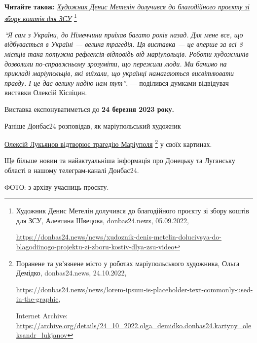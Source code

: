 \textbf{Читайте також:} \href{https://donbas24.news/news/xudoznik-denis-metelin-dolucivsya-do-blagodiinogo-projektu-zi-zboru-kostiv-dlya-zsu-video}{\emph{Художник Денис Метелін долучився до благодійного проєкту зі збору коштів для ЗСУ}}%
\footnote{Художник Денис Метелін долучився до благодійного проєкту зі збору коштів для ЗСУ, Алевтина Швецова, donbas24.news, 05.09.2022, \par%
\url{https://donbas24.news/news/xudoznik-denis-metelin-dolucivsya-do-blagodiinogo-projektu-zi-zboru-kostiv-dlya-zsu-video}%
}


\begin{leftbar}
\emph{\enquote{Я сам з України, до Німеччини приїхав багато років назад. Для мене все, що
відбувається в Україні — велика трагедія. Ця виставка — це вперше за
всі 8 місяців така потужна рефлексія-відповідь від маріупольців. Роботи
художників дозволили по-справжньому зрозуміти, що пережили люди. Ми
бачимо на прикладі маріупольців, які виїхали, що українці намагаються
висвітлювати правду. І це дає велику надію нам тут}}, — поділився
думками відвідувач виставки Олексій Кісліцин.
\end{leftbar}

Виставка експонуватиметься до \textbf{24 березня 2023 року.}


Раніше Донбас24 розповідав, як маріупольський художник\par\noindent\href{https://archive.org/details/24_10_2022.olga_demidko.donbas24.kartyny_oleksandr_lukjanov}{Олексій Лукьянов відтворює трагедію Маріуполя}%
\footnote{Поранене та ув'язнене місто у роботах маріупольського художника, Ольга Демідко, donbas24.news, 24.10.2022, \par%
\url{https://donbas24.news/news/lorem-ipsum-is-placeholder-text-commonly-used-in-the-graphic}, \par%
Internet Archive: \url{https://archive.org/details/24_10_2022.olga_demidko.donbas24.kartyny_oleksandr_lukjanov}%
} у своїх картинах.

Ще більше новин та найактуальніша інформація про Донецьку та Луганську області
в нашому телеграм-каналі Донбас24.

ФОТО: з архіву учасниць проєкту.

